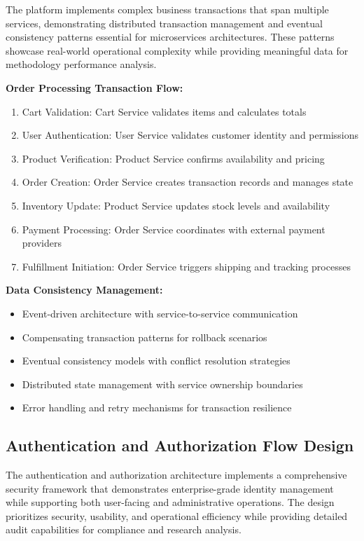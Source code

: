 The platform implements complex business transactions that span multiple services, demonstrating distributed transaction management and eventual consistency patterns essential for microservices architectures. These patterns showcase real-world operational complexity while providing meaningful data for methodology performance analysis.

\textbf{Order Processing Transaction Flow:}
\begin{enumerate}
\item Cart Validation: Cart Service validates items and calculates totals
\item User Authentication: User Service validates customer identity and permissions
\item Product Verification: Product Service confirms availability and pricing
\item Order Creation: Order Service creates transaction records and manages state
\item Inventory Update: Product Service updates stock levels and availability
\item Payment Processing: Order Service coordinates with external payment providers
\item Fulfillment Initiation: Order Service triggers shipping and tracking processes
\end{enumerate}

\textbf{Data Consistency Management:}
\begin{itemize}
\item Event-driven architecture with service-to-service communication
\item Compensating transaction patterns for rollback scenarios
\item Eventual consistency models with conflict resolution strategies
\item Distributed state management with service ownership boundaries
\item Error handling and retry mechanisms for transaction resilience
\end{itemize}

\subsection{Authentication and Authorization Flow Design}

The authentication and authorization architecture implements a comprehensive security framework that demonstrates enterprise-grade identity management while supporting both user-facing and administrative operations. The design prioritizes security, usability, and operational efficiency while providing detailed audit capabilities for compliance and research analysis.

